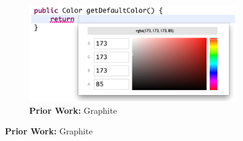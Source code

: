 \begin{figure}
  \begin{minipage}[t]{0.38\textwidth}
    \begin{subfigure}[t]{\linewidth}
    \begin{snugshade}
      \vspace*{-2mm}
      \caption{\textbf{Prior Work:} Graphite}
      \vspace*{1mm}
     \end{snugshade}
      \vspace*{1.5mm}
      \includegraphics[width=\linewidth]{graphite-color-palette.png}
      \vspace*{2mm}
    \end{subfigure}
    

\end{minipage}
\end{figure}
